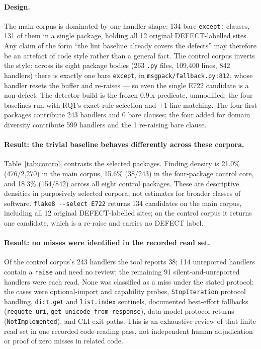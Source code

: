 \documentclass[10pt,a4paper]{article}
\begin{document}
\paragraph{Design.} The main corpus is dominated by one handler shape: 134 bare
\texttt{except:} clauses, 131 of them in a single package, holding all 12 original DEFECT-labelled sites. Any claim of the form ``the lint baseline already covers the defects''
may therefore be an artefact of code style rather than a general fact. The control
corpus inverts the style: across its eight package bodies (263 \texttt{.py} files,
109{,}400 lines, 842 handlers) there is exactly one bare \texttt{except}, in
\texttt{msgpack/fallback.py:812}, whose handler resets the buffer and re-raises
--- so even the single E722 candidate is a non-defect. The detector build is the
frozen 0.9.x predicate, unmodified; the four baselines run with RQ1's exact rule
selection and $\pm$1-line matching. The four first packages contribute 243 handlers
and 0 bare clauses; the four added for domain diversity contribute 599 handlers
and the 1 re-raising bare clause.

\paragraph{Result: the trivial baseline behaves differently across these
corpora.} Table~\ref{tab:control} contrasts the selected packages. Finding
density is 21.0\% (476/2{,}270) in the main corpus, 15.6\% (38/243) in the
four-package control core, and 18.3\% (154/842) across all eight control
packages. These are descriptive densities in purposively selected corpora, not
estimates for broader classes of software. \texttt{flake8 -{}-select E722}
returns 134 candidates on the main corpus, including all 12 original
DEFECT-labelled sites; on the control corpus it returns one candidate, which is
a re-raise and carries no DEFECT label.

\paragraph{Result: no misses were identified in the recorded read set.} Of the control
corpus's 243 handlers the tool reports 38; 114 unreported handlers contain a
\texttt{raise} and need no review; the remaining 91 silent-and-unreported
handlers were each read. None was classified as a miss under the stated protocol:
the cases were optional-import and capability probes, \texttt{StopIteration}
protocol handling, \texttt{dict.get} and \texttt{list.index} sentinels,
documented best-effort fallbacks (\texttt{requote\_uri},
\texttt{get\_unicode\_from\_response}), data-model protocol returns
(\texttt{NotImplemented}), and CLI exit paths. This is an exhaustive review of
that finite read set in one recorded code-reading pass, not independent
human adjudication or proof of zero misses in related code.
\end{document}
